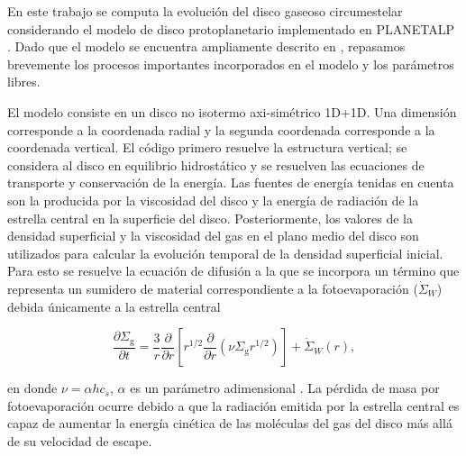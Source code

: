 \documentclass[baaa]{baaa}
\begin{document}
En este trabajo se computa la evolución del disco gaseoso circumestelar considerando el modelo de disco protoplanetario implementado en {\scriptsize PLANETALP} \citep[e.g.][]{pronco2017, Octavio2017}. Dado que el modelo se encuentra ampliamente descrito en \cite{Octavio2017}, repasamos brevemente los procesos importantes incorporados en el modelo y los parámetros libres.

El modelo consiste en un disco no isotermo axi-simétrico 1D+1D. Una dimensión corresponde a la coordenada radial y la segunda coordenada corresponde a la coordenada vertical. El código primero resuelve la estructura vertical; se considera al disco en equilibrio hidrostático y se resuelven las ecuaciones de transporte y conservación de la energía. Las fuentes de energía tenidas en cuenta son la producida por la viscosidad del disco y la energía de radiación de la estrella central en la superficie del disco. Posteriormente, los valores de la densidad superficial y la viscosidad del gas en el plano medio del disco son utilizados para calcular la evolución temporal de la densidad superficial inicial. Para esto se resuelve la ecuación de difusión a la que se incorpora un término que representa un sumidero de material correspondiente a la fotoevaporaci\'on ($\dot{\Sigma}_W $) debida únicamente a la estrella central \citep[e.g]{pringle1981accretion, Octavio2017}

\begin{equation} 
  \frac{\partial \Sigma_{\text{g}}} {\partial t}= \frac{3}{r}\frac{\partial}{\partial r} \left[ r^{1/2} \frac{\partial}{\partial r} \left( \nu \Sigma_{\text{g}} r^{1/2}  \right) \right] + \dot{\Sigma}_W (r),
\label{eq:disk_evol}
\end{equation}

en donde $\nu = \alpha h c_{s} $, $\alpha$ es un par\'ametro adimensional \citep{shakura1973black}. La p\'erdida de masa por fotoevaporaci\'on ocurre debido a que la radiación emitida por la estrella central es capaz de aumentar la energía cinética de las moléculas del gas del disco más allá de su velocidad de escape.
 
\end{document}

